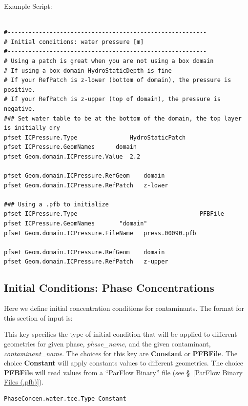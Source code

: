 Example Script:
\begin{display}\begin{verbatim}

#---------------------------------------------------------
# Initial conditions: water pressure [m]
#---------------------------------------------------------
# Using a patch is great when you are not using a box domain
# If using a box domain HydroStaticDepth is fine
# If your RefPatch is z-lower (bottom of domain), the pressure is positive.
# If your RefPatch is z-upper (top of domain), the pressure is negative.
### Set water table to be at the bottom of the domain, the top layer is initially dry
pfset ICPressure.Type				HydroStaticPatch
pfset ICPressure.GeomNames		domain
pfset Geom.domain.ICPressure.Value	2.2

pfset Geom.domain.ICPressure.RefGeom	domain
pfset Geom.domain.ICPressure.RefPatch	z-lower

### Using a .pfb to initialize
pfset ICPressure.Type                                   PFBFile
pfset ICPressure.GeomNames		 "domain"
pfset Geom.domain.ICPressure.FileName	press.00090.pfb

pfset Geom.domain.ICPressure.RefGeom	domain
pfset Geom.domain.ICPressure.RefPatch	z-upper
\end{verbatim}\end{display}


\subsection{Initial Conditions: Phase Concentrations}
\label{Initial Conditions: Phase Concentrations}

Here we define initial concentration conditions for contaminants.
The format for this section of input is:

{
This key specifies the type of initial condition that will be applied
to different geometries for given phase, {\em phase\_name}, and the
given contaminant, {\em contaminant\_name}.  The choices for this key
are {\bf Constant} or {\bf PFBFile}.  The choice {\bf Constant} will
apply constants values to different geometries.  The choice
{\bf PFBFile}  will read values from a ``ParFlow Binary'' file
(see \S~\ref{ParFlow Binary Files (.pfb)}).
}
\begin{display}\begin{verbatim}
PhaseConcen.water.tce.Type Constant
\end{verbatim}\end{display}

